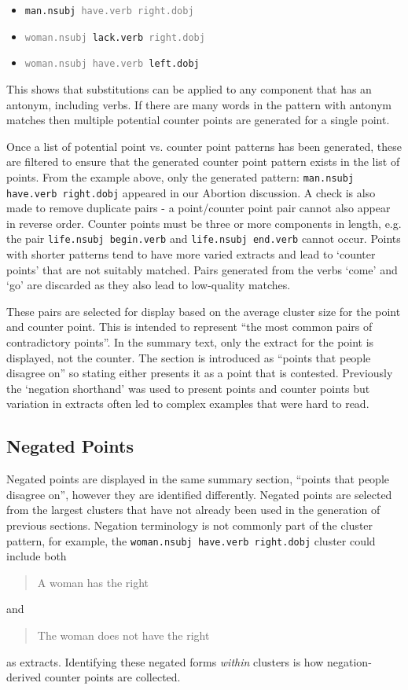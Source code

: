       \begin{itemize}[label={$\bullet$}]
        \item{\texttt{man.nsubj \textcolor{gray}{have.verb right.dobj}}}
        \item{\texttt{\textcolor{gray}{woman.nsubj} lack.verb \textcolor{gray}{right.dobj}}}
        \item{\texttt{\textcolor{gray}{woman.nsubj have.verb} left.dobj}}
      \end{itemize}

      This shows that substitutions can be applied to any component that has an antonym, including verbs. If there are many words in the pattern with antonym matches then multiple potential counter points are generated for a single point.

      Once a list of potential point vs. counter point patterns has been generated, these are filtered to ensure that the generated counter point pattern exists in the list of points. From the example above, only the generated pattern: \texttt{man.nsubj have.verb right.dobj} appeared in our Abortion discussion. A check is also made to remove duplicate pairs - a point/counter point pair cannot also appear in reverse order. Counter points must be three or more components in length, e.g. the pair \texttt{life.nsubj begin.verb} and \texttt{life.nsubj end.verb} cannot occur. Points with shorter patterns tend to have more varied extracts and lead to `counter points' that are not suitably matched. Pairs generated from the verbs `come' and `go' are discarded as they also lead to low-quality matches.

      These pairs are selected for display based on the average cluster size for the point and counter point. This is intended to represent ``the most common pairs of contradictory points''. In the summary text, only the extract for the point is displayed, not the counter. The section is introduced as ``points that people disagree on'' so stating either presents it as a point that is contested. Previously the `negation shorthand' was used to present points and counter points but variation in extracts often led to complex examples that were hard to read.

    \subsection{Negated Points \label{neg-points}}
      Negated points are displayed in the same summary section, ``points that people disagree on'', however they are identified differently. Negated points are selected from the largest clusters that have not already been used in the generation of previous sections. Negation terminology is not commonly part of the cluster pattern, for example, the \texttt{woman.nsubj have.verb right.dobj} cluster could include both \blockquote{A woman has the right} and \blockquote{The woman does not have the right} as extracts. Identifying these negated forms \textit{within} clusters is how negation-derived counter points are collected.

